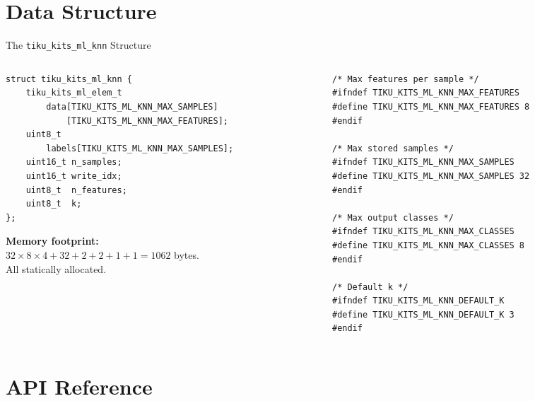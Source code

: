 \documentclass[aspectratio=169, 10pt]{beamer}
\begin{document}
\section{Data Structure}

\begin{frame}[fragile]{The \texttt{tiku\_kits\_ml\_knn} Structure}
\begin{columns}[T]
\begin{column}{0.48\textwidth}
\begin{lstlisting}[style=cstyle,
  title={ml/classification/tiku\_kits\_ml\_knn.h}]
struct tiku_kits_ml_knn {
    tiku_kits_ml_elem_t
        data[TIKU_KITS_ML_KNN_MAX_SAMPLES]
            [TIKU_KITS_ML_KNN_MAX_FEATURES];
    uint8_t
        labels[TIKU_KITS_ML_KNN_MAX_SAMPLES];
    uint16_t n_samples;
    uint16_t write_idx;
    uint8_t  n_features;
    uint8_t  k;
};
\end{lstlisting}

\textbf{Memory footprint:}\\
$32 \times 8 \times 4 + 32 + 2 + 2 + 1 + 1 = 1062$ bytes.\\
All statically allocated.
\end{column}

\begin{column}{0.48\textwidth}
\begin{lstlisting}[style=cstyle,
  title={Configuration macros}]
/* Max features per sample */
#ifndef TIKU_KITS_ML_KNN_MAX_FEATURES
#define TIKU_KITS_ML_KNN_MAX_FEATURES 8
#endif

/* Max stored samples */
#ifndef TIKU_KITS_ML_KNN_MAX_SAMPLES
#define TIKU_KITS_ML_KNN_MAX_SAMPLES 32
#endif

/* Max output classes */
#ifndef TIKU_KITS_ML_KNN_MAX_CLASSES
#define TIKU_KITS_ML_KNN_MAX_CLASSES 8
#endif

/* Default k */
#ifndef TIKU_KITS_ML_KNN_DEFAULT_K
#define TIKU_KITS_ML_KNN_DEFAULT_K 3
#endif
\end{lstlisting}
\end{column}
\end{columns}
\end{frame}

\section{API Reference}
\end{document}
